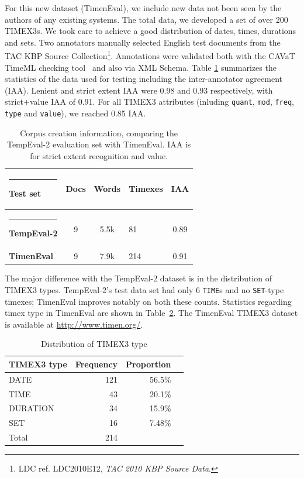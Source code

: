 \documentclass[10pt, a4paper]{article}
\begin{document}
For this new dataset (TimenEval), we include new data not been seen by the authors of any existing systems. The total data, we developed a set of over 200 TIMEX3s. We took care to achieve a good distribution of dates, times, durations and sets. Two annotators manually selected English test documents from the TAC KBP Source Collection\footnote{\scriptsize LDC ref. LDC2010E12, \emph{TAC 2010 KBP Source Data}.}. Annotations were validated both with the CAVaT TimeML checking tool~\cite{derczynski2010cavat} and also via XML Schema. Table \ref{tab:Data} summarizes the statistics of the data used for testing including the inter-annotator agreement (IAA). Lenient and strict extent IAA were 0.98 and 0.93 respectively, with strict+value IAA of 0.91. For all TIMEX3 attributes (inluding \texttt{quant}, \texttt{mod}, \texttt{freq}, \texttt{type} and \texttt{value}), we reached 0.85 IAA.

\begin{table} [htb]
\begin{footnotesize}
\begin{center}
\begin{tabular} {lcclc}
  \hline\rule{-2pt}{8pt}
  {\bf Test set} & {\bf Docs} & {\bf Words} & {\bf Timexes} & {\bf IAA}\\
  \hline\rule{-2pt}{8pt}
  {\bf TempEval-2} 	& 9	&  5.5k 	& 81  & 0.89\\
  {\bf TimenEval}		& 9	&  7.9k 	& 214  & 0.91\\
  \hline
\end{tabular}
\caption{Corpus creation information, comparing the TempEval-2 evaluation set with TimenEval. IAA is for strict extent recognition and value.}
\label{tab:Data}
\end{center}
\end{footnotesize}
\end{table}

The major difference with the TempEval-2 dataset is in the distribution of TIMEX3 types. TempEval-2's test data set had only 6 \texttt{TIME}s and no \texttt{SET}-type timexes; TimenEval improves notably on both these counts. Statistics regarding timex type in TimenEval are shown in Table~\ref{tab:timeneval-type}. The TimenEval TIMEX3 dataset is available at \url{http://www.timen.org/}.

\begin{table}
\begin{center}
\begin{tabular}{  l  r  r  r  }
\hline
\textbf{TIMEX3 type} & \textbf{Frequency} & \textbf{Proportion} \\
\hline
DATE & 121 & 56.5\% \\
TIME & 43 & 20.1\% \\
DURATION & 34 & 15.9\% \\
SET & 16 & 7.48\% \\
\hline
Total & 214 &  \\
\hline
\end{tabular}
\caption{Distribution of TIMEX3 type}
\label{tab:timeneval-type}
\end{center}
\end{table}
\end{document}

